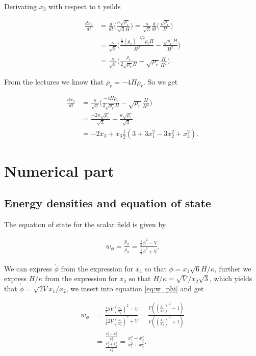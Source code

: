 \documentclass[a4paper,10pt]{article}
\begin{document}
Derivating $x_3$ with respect to t yeilds

\begin{align*}
\frac{dx_3}{dt} &= \frac{d}{dt}\bigg(\frac{\kappa \sqrt{\rho_r}}{\sqrt{3}H}\bigg) = \frac{\kappa}{\sqrt{3}}\frac{d}{dt}\bigg(\frac{\sqrt{\rho_r}}{H}\bigg) \\
&= \frac{\kappa}{\sqrt{3}}\bigg(\frac{\frac{1}{2}(\rho_r)^{-1/2}\dot{\rho_r}H}{H^2} - \frac{\sqrt{\rho_r}\dot{H}}{H^2}\bigg) \\
&= \frac{\kappa}{\sqrt{3}}\bigg(\frac{\dot{\rho_r}}{2\sqrt{\rho_r}H} - \sqrt{\rho_r}\frac{\dot{H}}{H^2}\bigg).
\end{align*}

From the lectures we know that $\dot{\rho_r} = -4H\rho_r$. So we get

\begin{align*}
\frac{dx_3}{dt} &= \frac{\kappa}{\sqrt{3}} \bigg(\frac{-4H\rho_r}{2\sqrt{\rho_r} H} - \sqrt{\rho_r}\frac{\dot{H}}{H^2}\bigg) \\
&= \frac{-2\kappa \sqrt{\rho_r}}{\sqrt{3}} - \frac{\kappa \sqrt{\rho_r}}{\sqrt{3}} \\
&= -2x_3 + x_3 \frac{1}{2}(3 + 3x_1^2 - 3x_2^2 + x_3^2).
\end{align*}


\section{Numerical part}
\subsection{Energy densities and equation of state}

The equation of state for the scalar field is given by

\begin{align}\label{eq:w_phi}
w_{\phi} = \frac{p_{\phi}}{\rho_{\phi}} = \frac{\frac{1}{2}\dot{\phi}^2 - V}{\frac{1}{2}\dot{\phi}^2 + V}.
\end{align}

We can express $\dot{\phi}$ from the expression for $x_1$ so that $\dot{\phi} = x_1\sqrt{6}H/\kappa$, further we express $H/\kappa$ from the expression for $x_2$ so that $H/\kappa = \sqrt{V}/x_2\sqrt{3}$, which yields that $\dot{\phi} = \sqrt{2V}x_1/x_2$, we insert into equation \eqref{eq:w_phi} and get

\begin{align*}
w_{\phi} &= \frac{\frac{1}{2}2V(\frac{x_1}{x_2})^2 - V}{\frac{1}{2}2V(\frac{x_1}{x_2})^2 + V} = \frac{V((\frac{x_1}{x_2})^2 - 1)}{V((\frac{x_1}{x_2})^2 + 1)} \\
&= \frac{\frac{x_1^2 - x_2^2}{x_2^2}}{\frac{x_1^2 + x_2^2}{x_2^2}} = \frac{x_1^2 - x_2^2}{x_1^2 + x_2^2}.
\end{align*}
\end{document}

